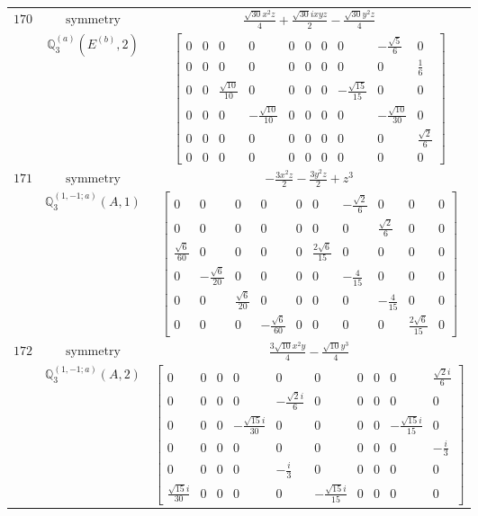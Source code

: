\documentclass[fleqn,8pt,landscape]{jsarticle}
\begin{document}
\begin{longtable}{ccc}
$ 170 $ & $ \text{symmetry} $ & $ \frac{\sqrt{30} x^{2} z}{4} + \frac{\sqrt{30} i x y z}{2} - \frac{\sqrt{30} y^{2} z}{4} $ \\
$  $ & $ \mathbb{Q}_{3}^{(a)}(E^{(b)},2) $ & $ \begin{bmatrix} 0 & 0 & 0 & 0 & 0 & 0 & 0 & 0 & - \frac{\sqrt{5}}{6} & 0 \\ 0 & 0 & 0 & 0 & 0 & 0 & 0 & 0 & 0 & \frac{1}{6} \\ 0 & 0 & \frac{\sqrt{10}}{10} & 0 & 0 & 0 & 0 & - \frac{\sqrt{15}}{15} & 0 & 0 \\ 0 & 0 & 0 & - \frac{\sqrt{10}}{10} & 0 & 0 & 0 & 0 & - \frac{\sqrt{10}}{30} & 0 \\ 0 & 0 & 0 & 0 & 0 & 0 & 0 & 0 & 0 & \frac{\sqrt{2}}{6} \\ 0 & 0 & 0 & 0 & 0 & 0 & 0 & 0 & 0 & 0 \end{bmatrix} $ \\ \hline
$ 171 $ & $ \text{symmetry} $ & $ - \frac{3 x^{2} z}{2} - \frac{3 y^{2} z}{2} + z^{3} $ \\
$  $ & $ \mathbb{Q}_{3}^{(1,-1;a)}(A,1) $ & $ \begin{bmatrix} 0 & 0 & 0 & 0 & 0 & 0 & - \frac{\sqrt{2}}{6} & 0 & 0 & 0 \\ 0 & 0 & 0 & 0 & 0 & 0 & 0 & \frac{\sqrt{2}}{6} & 0 & 0 \\ \frac{\sqrt{6}}{60} & 0 & 0 & 0 & 0 & \frac{2 \sqrt{6}}{15} & 0 & 0 & 0 & 0 \\ 0 & - \frac{\sqrt{6}}{20} & 0 & 0 & 0 & 0 & - \frac{4}{15} & 0 & 0 & 0 \\ 0 & 0 & \frac{\sqrt{6}}{20} & 0 & 0 & 0 & 0 & - \frac{4}{15} & 0 & 0 \\ 0 & 0 & 0 & - \frac{\sqrt{6}}{60} & 0 & 0 & 0 & 0 & \frac{2 \sqrt{6}}{15} & 0 \end{bmatrix} $ \\ \hline
$ 172 $ & $ \text{symmetry} $ & $ \frac{3 \sqrt{10} x^{2} y}{4} - \frac{\sqrt{10} y^{3}}{4} $ \\
$  $ & $ \mathbb{Q}_{3}^{(1,-1;a)}(A,2) $ & $ \begin{bmatrix} 0 & 0 & 0 & 0 & 0 & 0 & 0 & 0 & 0 & \frac{\sqrt{2} i}{6} \\ 0 & 0 & 0 & 0 & - \frac{\sqrt{2} i}{6} & 0 & 0 & 0 & 0 & 0 \\ 0 & 0 & 0 & - \frac{\sqrt{15} i}{30} & 0 & 0 & 0 & 0 & - \frac{\sqrt{15} i}{15} & 0 \\ 0 & 0 & 0 & 0 & 0 & 0 & 0 & 0 & 0 & - \frac{i}{3} \\ 0 & 0 & 0 & 0 & - \frac{i}{3} & 0 & 0 & 0 & 0 & 0 \\ \frac{\sqrt{15} i}{30} & 0 & 0 & 0 & 0 & - \frac{\sqrt{15} i}{15} & 0 & 0 & 0 & 0 \end{bmatrix} $ \\ \hline

\end{longtable}
\end{document}
